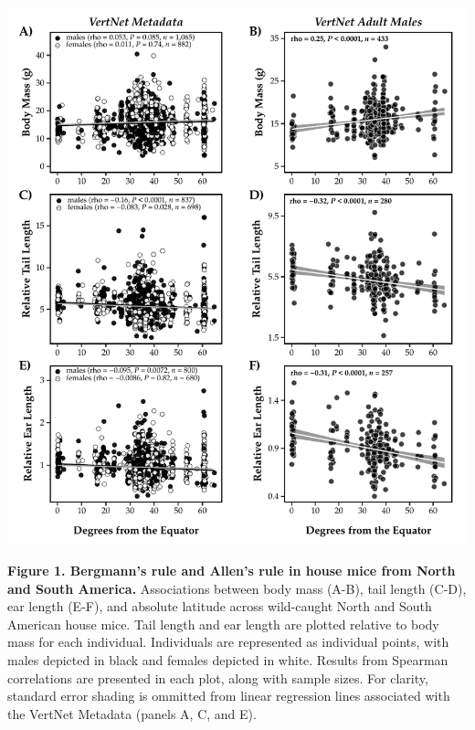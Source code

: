 \documentclass[]{article}
\begin{document}
\includegraphics{../results/figures/VertNet_relative.pdf}

\textbf{Figure 1. Bergmann's rule and Allen's rule in house mice from
North and South America.} Associations between body mass (A-B), tail
length (C-D), ear length (E-F), and absolute latitude across wild-caught
North and South American house mice. Tail length and ear length are
plotted relative to body mass for each individual. Individuals are
represented as individual points, with males depicted in black and
females depicted in white. Results from Spearman correlations are
presented in each plot, along with sample sizes. For clarity, standard
error shading is ommitted from linear regression lines associated with
the VertNet Metadata (panels A, C, and E).

\newpage
\end{document}
